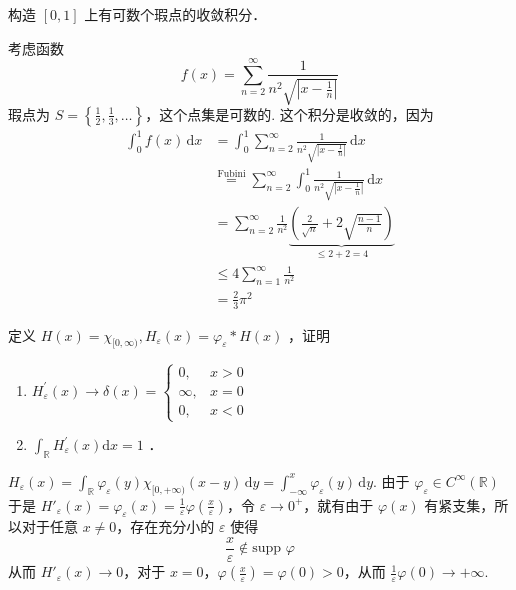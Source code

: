 \begin{exercise}
构造 $[0,1]$ 上有可数个瑕点的收敛积分．
\end{exercise}
考虑函数
\[
f(x)=\sum_{n=2}^{\infty} \frac{1}{n^{2}\sqrt{ \left\lvert  x-\frac{1}{n}  \right\rvert  }}
\]
瑕点为 $S=\left\{  \frac{1}{2},\frac{1}{3},\dots  \right\}$，这个点集是可数的. 这个积分是收敛的，因为
\[
\begin{aligned}
\int_{0}^{1} f(x) \, \mathrm{d}x  & =\int_{0}^{1} \sum_{n=2}^{\infty} \frac{1}{n^{2}\sqrt{ \left\lvert  x-\frac{1}{n}  \right\rvert  }} \, \mathrm{d}x  \\
 & \overset{ \text{Fubini}  }{ = }\sum_{n=2}^{\infty} \int_{0}^{1} \frac{1}{n^{2}\sqrt{ \left\lvert  x-\frac{1}{n}  \right\rvert  }} \, \mathrm{d}x  \\
 & =\sum_{n=2}^{\infty} \frac{1}{n^{2}}\underbrace{ \left( \frac{2}{\sqrt{ n }}+2\sqrt{ \frac{n-1}{n} } \right) }_{ \leq 2+2=4 }  \\
 & \leq 4\sum_{n=1}^{\infty} \frac{1}{n^{2}} \\
 & =\frac{2}{3}\pi^{2} 
\end{aligned}
\]
\begin{exercise}
定义 $H(x)=\chi_{[0, \infty)}, H_{\varepsilon}(x)=\varphi_{\varepsilon} * H(x)$ ，证明
	\begin{enumerate}
		\item $H_{\varepsilon}^{\prime}(x) \rightarrow \delta(x)= \begin{cases}0, & x>0 \\ \infty, & x=0 \\ 0, & x<0\end{cases}$
		\item $\int_{\mathbb{R}} H_{\varepsilon}^{\prime}(x) \mathrm{d} x=1$ ．
	\end{enumerate}
\end{exercise}
$H_{\varepsilon}(x)=\int_{\mathbb{R}}^{} \varphi_{\varepsilon}(y)\chi_{[0,+\infty)}(x-y) \, \mathrm{d}y=\int_{-\infty}^{x} \varphi_{\varepsilon}(y) \, \mathrm{d}y$. 由于 $\varphi_{\varepsilon}\in C^{\infty}(\mathbb{R})$ 于是 $H'_{\varepsilon}(x)=\varphi_{\varepsilon}(x)=\frac{1}{\varepsilon}\varphi\left( \frac{x}{\varepsilon} \right)$，令 $\varepsilon\to 0^{+}$，就有由于 $\varphi(x)$ 有紧支集，所以对于任意 $x\neq0$，存在充分小的 $\varepsilon$ 使得
\[
\frac{x}{\varepsilon}\not\in \text{supp }\varphi
\]
从而 $H'_{\varepsilon}(x)\to0$，对于 $x=0$，$\varphi\left( \frac{x}{\varepsilon} \right)=\varphi(0)>0$，从而 $\frac{1}{\varepsilon}\varphi(0)\to+\infty$.

